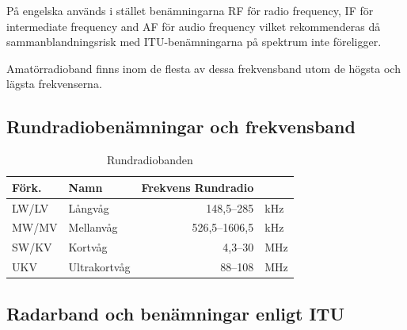 På engelska används i stället benämningarna RF för radio frequency, IF för intermediate frequency and AF för audio frequency vilket rekommenderas då sammanblandningsrisk med ITU-benämningarna på spektrum inte föreligger.

Amatörradioband finns inom de flesta av dessa frekvensband utom de högsta och lägsta frekvenserna.

\subsection{Rundradiobenämningar och frekvensband}

\begin{table}[H]
\centering
\begin{tabular}{llrl}
\textbf{Förk.} & \textbf{Namn} & \textbf{Frekvens Rundradio} &     \\ \hline
LW/LV          & Långvåg       & 148,5--285                  & kHz \\
MW/MV          & Mellanvåg     & 526,5--1606,5               & kHz \\
SW/KV          & Kortvåg       & 4,3--30                     & MHz \\
UKV            & Ultrakortvåg  & 88--108                     & MHz \\
\end{tabular}
\caption{Rundradiobanden}
\end{table}

\subsection{Radarband och benämningar enligt ITU}

